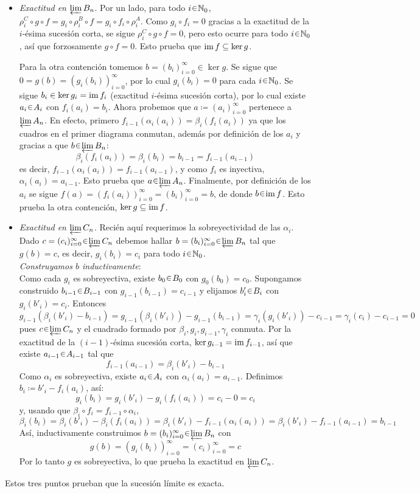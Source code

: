 \begin{sol}
\begin{itemize}
\item\emph{Exactitud en $\varprojlim B_n$}. 
Por un lado, para todo $i\en\mathbb{N}_0$, $\rho^C_i \circ g \circ f = g_i\circ\rho^B_i \circ f = g_i \circ f_i \circ \rho^A_i$. Como $g_i\circ f_i = 0$ gracias a la exactitud de la $i$-ésima sucesión corta, se sigue $\rho^C_i \circ g \circ f = 0$, pero esto ocurre para todo $i\en\mathbb{N}_0$, así que forzosamente $g \circ f =0$. Esto prueba que $\operatorname{im} f \subseteq \ker g$.\par
Para la otra contención tomemos $b=(b_i)^\infty_{i=0} \in \ker g$. Se sigue que $0= g(b) = (g_i(b_i))^\infty_{i=0}$, por lo cual $g_i(b_i) = 0$ para cada $i\en\mathbb{N}_0$. Se sigue $b_i \in \ker g_i = \operatorname{im} f_i$ (exactitud $i$-ésima sucesión corta), por lo cual existe $a_i \en A_i$ con $f_i(a_i) = b_i$. Ahora probemos que $a \coloneq (a_i)^\infty_{i=0}$ pertenece a $\varprojlim A_n$. En efecto, primero $f_{i-1}(\alpha_i(a_i)) = \beta_i(f_i(a_i))$ ya que los cuadros en el primer diagrama conmutan, además por definición de los $a_i$ y gracias a que $b\en\varprojlim B_n$:
\[
\beta_i(f_i(a_i))=\beta_i(b_i) = b_{i-1} = f_{i-1}(a_{i-1})
\]
es decir, $f_{i-1}(\alpha_i(a_i)) = f_{i-1}(a_{i-1})$, y como $f_i$ es inyectiva, $\alpha_i(a_i) = a_{i-1}$. Esto prueba que $a \en \varprojlim A_n$. Finalmente, por definición de los $a_i$ se sigue $f(a) = (f_i(a_i))^\infty_{i=0}=(b_i)^\infty_{i=0} = b$, de donde $b\en\im f$. Esto prueba la otra contención, $\ker g \subseteq \operatorname{im} f$.

\item\emph{Exactitud en $\varprojlim C_n$}. Recién aquí requerimos la sobreyectividad de las $\alpha_i$.
Dado $c=(c_i)^\infty_{i=0}\en\varprojlim C_n$ debemos hallar $b=(b_i)^\infty_{i=0}\en\varprojlim B_n$ tal que $g(b)=c$, es decir, $g_i(b_i)=c_i$ para todo $i\en\mathbb{N}_0$.\medskip\\
\emph{Construyamos $b$ inductivamente}:\\ 
Como cada $g_i$ es sobreyectiva, existe $b_0\en B_0$ con $g_0(b_0)=c_0$. Supongamos construido $b_{i-1}\en B_{i-1}$ con $g_{i-1}(b_{i-1})=c_{i-1}$ y elijamos $b'_i\en B_i$ con $g_i(b'_i)=c_i$. Entonces
\[
g_{i-1}(\beta_i(b'_i)-b_{i-1})
= g_{i-1}(\beta_i(b'_i))-g_{i-1}(b_{i-1})
= \gamma_i(g_i(b'_i))-c_{i-1}
= \gamma_i(c_i)-c_{i-1}
=0
\]
pues $c\en\varprojlim C_n$ y el cuadrado formado por $\beta_i,g_i,g_{i-1},\gamma_i$ conmuta. Por la exactitud de la $(i-1)$-ésima sucesión corta, $\ker g_{i-1}=\operatorname{im} f_{i-1}$, así que existe $a_{i-1}\en A_{i-1}$ tal que
\[
f_{i-1}(a_{i-1})=\beta_i(b'_i)-b_{i-1}
\]
Como $\alpha_i$ es sobreyectiva, existe $a_i\en A_i$ con $\alpha_i(a_i)=a_{i-1}$. Definimos $b_i \coloneq b'_i - f_i(a_i)$, así:
\[
g_i(b_i)
= g_i(b'_i)-g_i(f_i(a_i))
= c_i - 0 = c_i
\]
y, usando que $\beta_i\circ f_i=f_{i-1}\circ\alpha_i$,
\[
\beta_i(b_i)
= \beta_i(b'_i)-\beta_i(f_i(a_i))
= \beta_i(b'_i)-f_{i-1}(\alpha_i(a_i))
= \beta_i(b'_i)-f_{i-1}(a_{i-1})
= b_{i-1}
\]
Así, inductivamente construimos $b=(b_i)^\infty_{i=0}\en\varprojlim B_n$ con
\[
g(b)=(g_i(b_i))^\infty_{i=0}=(c_i)^\infty_{i=0}=c
\]
Por lo tanto $g$ es sobreyectiva, lo que prueba la exactitud en $\varprojlim C_n$.
\end{itemize}
Estos tres puntos prueban que la sucesión límite es exacta.
\end{sol}